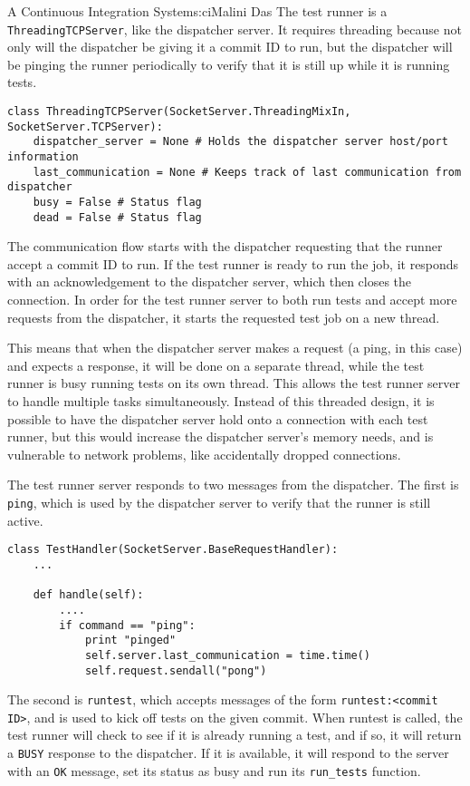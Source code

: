 \begin{aosachapter}{A Continuous Integration System}{s:ci}{Malini Das}
The test runner is a \texttt{ThreadingTCPServer}, like the dispatcher
server. It requires threading because not only will the dispatcher be
giving it a commit ID to run, but the dispatcher will be pinging the
runner periodically to verify that it is still up while it is running
tests.

\begin{verbatim}
class ThreadingTCPServer(SocketServer.ThreadingMixIn, SocketServer.TCPServer):
    dispatcher_server = None # Holds the dispatcher server host/port information
    last_communication = None # Keeps track of last communication from dispatcher
    busy = False # Status flag
    dead = False # Status flag
\end{verbatim}

The communication flow starts with the dispatcher requesting that the
runner accept a commit ID to run. If the test runner is ready to run the
job, it responds with an acknowledgement to the dispatcher server, which
then closes the connection. In order for the test runner server to both
run tests and accept more requests from the dispatcher, it starts the
requested test job on a new thread.

This means that when the dispatcher server makes a request (a ping, in
this case) and expects a response, it will be done on a separate thread,
while the test runner is busy running tests on its own thread. This
allows the test runner server to handle multiple tasks simultaneously.
Instead of this threaded design, it is possible to have the dispatcher
server hold onto a connection with each test runner, but this would
increase the dispatcher server's memory needs, and is vulnerable to
network problems, like accidentally dropped connections.

The test runner server responds to two messages from the dispatcher. The
first is \texttt{ping}, which is used by the dispatcher server to verify
that the runner is still active.

\begin{verbatim}
class TestHandler(SocketServer.BaseRequestHandler):
    ...

    def handle(self):
        ....
        if command == "ping":
            print "pinged"
            self.server.last_communication = time.time()
            self.request.sendall("pong")
\end{verbatim}

The second is \texttt{runtest}, which accepts messages of the form
\texttt{runtest:\textless{}commit ID\textgreater{}}, and is used to kick
off tests on the given commit. When runtest is called, the test runner
will check to see if it is already running a test, and if so, it will
return a \texttt{BUSY} response to the dispatcher. If it is available,
it will respond to the server with an \texttt{OK} message, set its
status as busy and run its \texttt{run\_tests} function.


\end{aosachapter}
